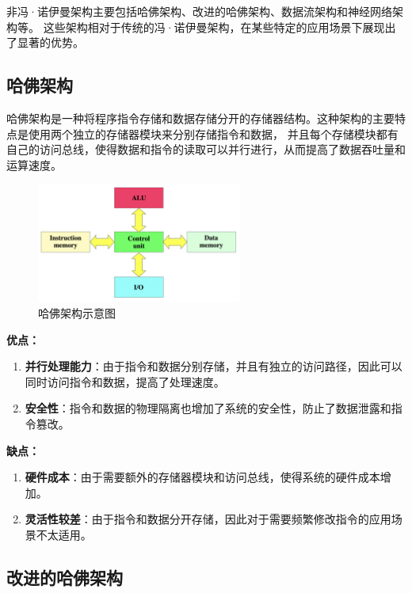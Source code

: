 \documentclass[12pt]{article} %
\theoremstyle{definition}
\begin{document}
非冯·诺伊曼架构主要包括哈佛架构、改进的哈佛架构、数据流架构和神经网络架构等\cite{Siriwardhane2020ComputerArchitecture}。
这些架构相对于传统的冯·诺伊曼架构，在某些特定的应用场景下展现出了显著的优势。

\subsection{哈佛架构}

哈佛架构是一种将程序指令存储和数据存储分开的存储器结构。这种架构的主要特点是使用两个独立的存储器模块来分别存储指令和数据，
并且每个存储模块都有自己的访问总线，使得数据和指令的读取可以并行进行，从而提高了数据吞吐量和运算速度\cite{HarvardArchitecture, Pawson2022MythHarvard}。

\begin{figure}[h]
  \centering
  \includegraphics[width=0.6\textwidth]{./figs/Harvard_architecture.png}
  \caption{哈佛架构示意图\cite{HarvardArchitecture}}
  \label{fig:harvard-architecture}
\end{figure}

\textbf{优点：}
\begin{enumerate}
  \item \textbf{并行处理能力}：由于指令和数据分别存储，并且有独立的访问路径，因此可以同时访问指令和数据，提高了处理速度。
  \item \textbf{安全性}：指令和数据的物理隔离也增加了系统的安全性，防止了数据泄露和指令篡改。
\end{enumerate}

\textbf{缺点：}
\begin{enumerate}
  \item \textbf{硬件成本}：由于需要额外的存储器模块和访问总线，使得系统的硬件成本增加。
  \item \textbf{灵活性较差}：由于指令和数据分开存储，因此对于需要频繁修改指令的应用场景不太适用。
\end{enumerate}

\subsection{改进的哈佛架构}
\end{document}
